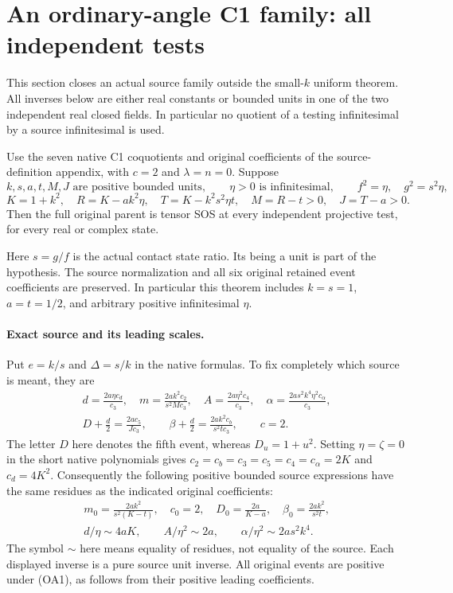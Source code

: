 \section{An ordinary-angle C1 family: all independent tests}
\label{sec:c1-ordinary-angle}

This section closes an actual source family outside the small-$k$
uniform theorem. All inverses below are either real constants or
bounded units in one of the two independent real closed fields.
In particular no quotient of a testing infinitesimal by a source
infinitesimal is used.

\begin{theorem}
\label{thm:c1-ordinary-angle}
Use the seven native C1 coquotients and original coefficients of
the source-definition appendix, with $c=2$ and $\lambda=n=0$.
Suppose
\[
 k,s,a,t,M,J\text{ are positive bounded units},\qquad
 \eta>0\text{ is infinitesimal},\qquad
 f^2=\eta,\quad g^2=s^2\eta,
\]
\[
 K=1+k^2,\quad R=K-ak^2\eta,\quad T=K-k^2s^2\eta t,
 \quad M=R-t>0,\quad J=T-a>0.                 \tag{OA1}
\]
Then the full original parent is tensor SOS at every independent
projective test, for every real or complex state.
\end{theorem}

Here $s=g/f$ is the actual contact state ratio. Its being a unit is
part of the hypothesis. The source normalization and all six original
retained event coefficients are preserved. In particular this theorem
includes $k=s=1$, $a=t=1/2$, and arbitrary positive infinitesimal $\eta$.

\paragraph{Exact source and its leading scales.}
Put $e=k/s$ and $\Delta=s/k$ in the native formulas. To fix completely
which source is meant, they are
\[
\begin{gathered}
 d=\frac{2a\eta c_d}{c_3},\quad
 m=\frac{2ak^2c_2}{s^2Mc_3},\quad
 A=\frac{2a\eta^2c_4}{c_3},\quad
 \alpha=\frac{2as^2k^4\eta^2c_\alpha}{c_3},\\
 D+\frac d2=\frac{2ac_5}{Jc_3},\qquad
 \beta+\frac d2=\frac{2ak^2c_b}{s^2tc_3},\qquad c=2.
                                                        \tag{OA2}
\end{gathered}
\]
The letter $D$ here denotes the fifth event, whereas $D_u=1+u^2$.
Setting $\eta=\zeta=0$ in the short native polynomials gives
$c_2=c_b=c_3=c_5=c_4=c_\alpha=2K$ and $c_d=4K^2$.
Consequently the following positive bounded source expressions have
the same residues as the indicated original coefficients:
\[
\begin{gathered}
 m_0=\frac{2ak^2}{s^2(K-t)},\quad
 c_0=2,\quad D_0=\frac{2a}{K-a},\quad
 \beta_0=\frac{2ak^2}{s^2t},\\
 d/\eta\sim4aK,\qquad A/\eta^2\sim2a,\qquad
 \alpha/\eta^2\sim2as^2k^4.                         \tag{OA3}
\end{gathered}
\]
The symbol $\sim$ here means equality of residues, not equality of
the source. Each displayed inverse is a pure source unit inverse.
All original events are positive under (OA1), as follows from their
positive leading coefficients.

